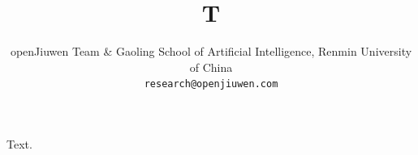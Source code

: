 \documentclass{article}
\title{T}
\author{%
  openJiuwen Team \& Gaoling School of Artificial Intelligence, Renmin University of China \\
  \texttt{research@openjiuwen.com}
}
\date{}
\begin{document}
\maketitle
Text.
\end{document}
